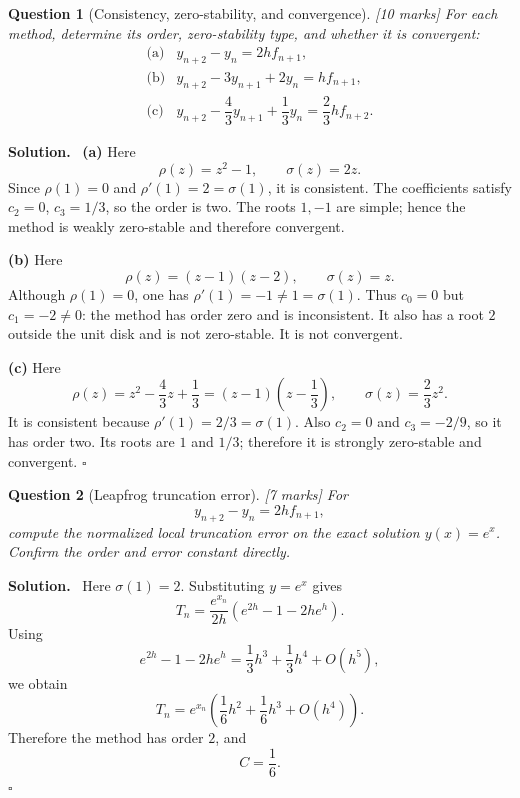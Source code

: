\documentclass[11pt,a4paper]{article}
\theoremstyle{questionstyle}
\newtheorem{question}{Question}
\newenvironment{solution}
  {\par\noindent\textbf{\color{solutiongreen}Solution.}\ }
  {\hfill$\square$\par}
\newcommand{\pointmark}[1]{\hfill\textnormal{\textit{[#1 marks]}}}
\begin{document}
\begin{question}[Consistency, zero-stability, and convergence]\pointmark{10}
For each method, determine its order, zero-stability type, and whether
it is convergent:
\[
\begin{array}{ll}
\text{(a)}&
 y_{n+2}-y_n=2hf_{n+1},\\[2pt]
\text{(b)}&
 y_{n+2}-3y_{n+1}+2y_n=hf_{n+1},\\[2pt]
\text{(c)}&
 y_{n+2}-\dfrac43y_{n+1}+\dfrac13y_n
 =\dfrac23hf_{n+2}.
\end{array}
\]
\end{question}

\begin{solution}
\textbf{(a)} Here
\[
  \rho(z)=z^2-1,\qquad \sigma(z)=2z.
\]
Since \(\rho(1)=0\) and \(\rho'(1)=2=\sigma(1)\), it is consistent.
The coefficients satisfy \(c_2=0\), \(c_3=1/3\), so the order is two.
The roots \(1,-1\) are simple; hence the method is weakly zero-stable
and therefore convergent.

\textbf{(b)} Here
\[
  \rho(z)=(z-1)(z-2),\qquad \sigma(z)=z.
\]
Although \(\rho(1)=0\), one has \(\rho'(1)=-1\neq1=\sigma(1)\).
Thus \(c_0=0\) but \(c_1=-2\neq0\): the method has order zero and is
inconsistent.  It also has a root \(2\) outside the unit disk and is
not zero-stable.  It is not convergent.

\textbf{(c)} Here
\[
  \rho(z)=z^2-\frac43z+\frac13
  =(z-1)\left(z-\frac13\right),
  \qquad \sigma(z)=\frac23z^2.
\]
It is consistent because
\(\rho'(1)=2/3=\sigma(1)\).  Also \(c_2=0\) and
\(c_3=-2/9\), so it has order two.  Its roots are \(1\) and \(1/3\);
therefore it is strongly zero-stable and convergent.
\end{solution}

\begin{question}[Leapfrog truncation error]\pointmark{7}
For
\[
  y_{n+2}-y_n=2hf_{n+1},
\]
compute the normalized local truncation error on the exact solution
\(y(x)=e^x\).  Confirm the order and error constant directly.
\end{question}

\begin{solution}
Here \(\sigma(1)=2\).  Substituting \(y=e^x\) gives
\[
  T_n=\frac{e^{x_n}}{2h}
  \left(e^{2h}-1-2he^h\right).
\]
Using
\[
  e^{2h}-1-2he^h
  =\frac13h^3+\frac13h^4+O(h^5),
\]
we obtain
\[
  T_n=e^{x_n}
  \left(\frac16h^2+\frac16h^3+O(h^4)\right).
\]
Therefore the method has order \(2\), and
\[
  \boxed{C=\frac16}.
\]
\end{solution}
\end{document}
